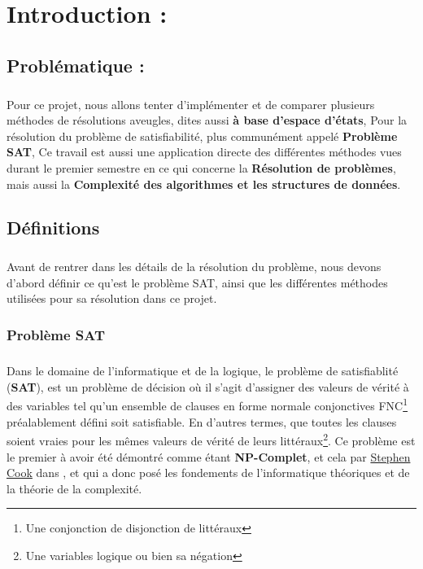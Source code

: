
\chapter{Introduction : }
\section{Problématique : }
\paragraph{}
Pour ce projet, nous allons tenter d'implémenter et de comparer plusieurs méthodes de résolutions aveugles, dites aussi \textbf{à base d'espace d'états}, Pour la résolution du problème de satisfiabilité, plus communément appelé \textbf{Problème SAT}, Ce travail est aussi une application directe des différentes méthodes vues durant le premier semestre en ce qui concerne la \textbf{Résolution de problèmes}, mais aussi la \textbf{Complexité des algorithmes et les structures de données}.
\section{Définitions}
\paragraph{}
Avant de rentrer dans les détails de la résolution du problème, nous devons d'abord définir ce qu'est le problème SAT, ainsi que les différentes méthodes utilisées pour sa résolution dans ce projet.
\subsection{Problème SAT}
\paragraph{}
Dans le domaine de l'informatique et de la logique, le problème de satisfiablité (\textbf{SAT}), est un problème de décision où il s'agit d'assigner des valeurs de vérité à des variables tel qu'un ensemble de clauses en forme normale conjonctives FNC\footnote{Une conjonction de disjonction de littéraux} préalablement défini soit satisfiable. En d'autres termes, que toutes les clauses soient vraies pour les mêmes valeurs de vérité de leurs littéraux\footnote{Une variables logique ou bien sa négation}. Ce problème est le premier à avoir été démontré comme étant \textbf{NP-Complet}, et cela par \href{https://en.wikipedia.org/wiki/Stephen_Cook}{Stephen Cook} dans \cite{cook}, et qui a donc posé les fondements de l'informatique théoriques et de la théorie de la complexité.
\newpage
